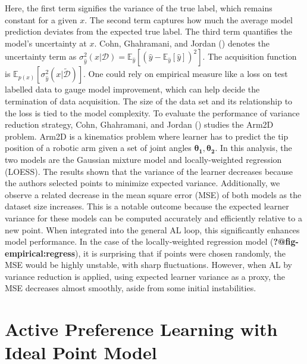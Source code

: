 \documentclass[
  letterpaper,
  numbers=noenddot,
  DIV=11]{scrreprt}
\theoremstyle{plain}
\theoremstyle{definition}
\theoremstyle{remark}
\begin{document}
Here, the first term signifies the variance of the true label, which
remains constant for a given \(x\). The second term captures how much
the average model prediction deviates from the expected true label. The
third term quantifies the model's uncertainty at \(x\). Cohn,
Ghahramani, and Jordan () denotes the
uncertainty term as
\(\sigma^2_{\hat{y}} (x | \mathcal{D}) = \mathbb{E}_{\hat{y}} [(\hat{y} - \mathbb{E}_{\hat{y}}[\hat{y}])^2]\).
The acquisition function is
\(\mathbb{E}_{p(x)} [\sigma^2_{\hat{y}} (x | \tilde{\mathcal{D}})]\).
One could rely on empirical measure like a loss on test labelled data to
gauge model improvement, which can help decide the termination of data
acquisition. The size of the data set and its relationship to the loss
is tied to the model complexity. To evaluate the performance of variance
reduction strategy, Cohn, Ghahramani, and Jordan
() studies the Arm2D problem. Arm2D is a
kinematics problem where learner has to predict the tip position of a
robotic arm given a set of joint angles
\(\mathbf{\theta_1}, \mathbf{\theta_2}\). In this analysis, the two
models are the Gaussian mixture model and locally-weighted regression
(LOESS). The results shown that the variance of the learner decreases
because the authors selected points to minimize expected variance.
Additionally, we observe a related decrease in the mean square error
(MSE) of both models as the dataset size increases. This is a notable
outcome because the expected learner variance for these models can be
computed accurately and efficiently relative to a new point. When
integrated into the general AL loop, this significantly enhances model
performance. In the case of the locally-weighted regression model
(\textbf{?@fig-empirical:regress}), it is surprising that if points were
chosen randomly, the MSE would be highly unstable, with sharp
fluctuations. However, when AL by variance reduction is applied, using
expected learner variance as a proxy, the MSE decreases almost smoothly,
aside from some initial instabilities.

\section{Active Preference Learning with Ideal Point
Model}\label{active-preference-learning-with-ideal-point-model}
\end{document}
